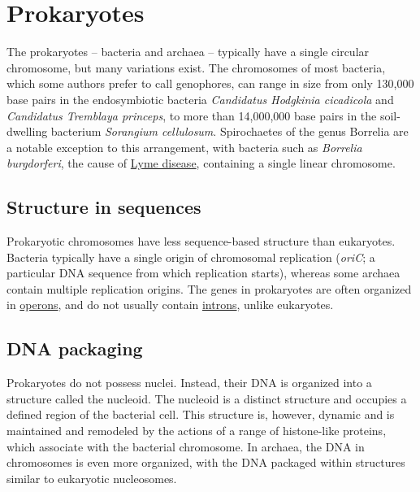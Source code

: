 \hypertarget{prokaryotes}{%
\section{Prokaryotes}\label{prokaryotes}}

The prokaryotes -- bacteria and archaea -- typically have a single circular chromosome, but many variations exist. The chromosomes of most bacteria, which some authors prefer to call genophores, can range in size from only 130,000 base pairs in the endosymbiotic bacteria \emph{Candidatus Hodgkinia cicadicola} and \emph{Candidatus Tremblaya princeps}, to more than 14,000,000 base pairs in the soil-dwelling bacterium \emph{Sorangium cellulosum}. Spirochaetes of the genus Borrelia are a notable exception to this arrangement, with bacteria such as \emph{Borrelia burgdorferi}, the cause of \href{https://en.wikipedia.org/wiki/Lyme_disease}{Lyme disease}, containing a single linear chromosome.

\hypertarget{structure-in-sequences}{%
\subsection{Structure in sequences}\label{structure-in-sequences}}

Prokaryotic chromosomes have less sequence-based structure than eukaryotes. Bacteria typically have a single origin of chromosomal replication (\emph{oriC}; a particular DNA sequence from which replication starts), whereas some archaea contain multiple replication origins. The genes in prokaryotes are often organized in \href{https://en.wikipedia.org/wiki/Operon}{operons}, and do not usually contain \href{https://en.wikipedia.org/wiki/Intron}{introns}, unlike eukaryotes.

\hypertarget{dna-packaging}{%
\subsection{DNA packaging}\label{dna-packaging}}

Prokaryotes do not possess nuclei. Instead, their DNA is organized into a structure called the nucleoid. The nucleoid is a distinct structure and occupies a defined region of the bacterial cell. This structure is, however, dynamic and is maintained and remodeled by the actions of a range of histone-like proteins, which associate with the bacterial chromosome. In archaea, the DNA in chromosomes is even more organized, with the DNA packaged within structures similar to eukaryotic nucleosomes.

